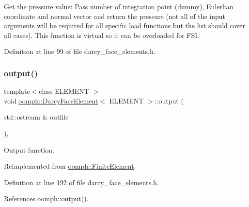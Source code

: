 Get the pressure value\+: Pass number of integration point (dummy), Eulerlian coordinate and normal vector and return the pressure (not all of the input arguments will be required for all specific load functions but the list should cover all cases). This function is virtual so it can be overloaded for F\+SI. 



Definition at line 99 of file darcy\+\_\+face\+\_\+elements.\+h.

\mbox{\label{classoomph_1_1DarcyFaceElement_aff94487a830df70d037c56d15fd4c462}} 
\subsubsection{\texorpdfstring{output()}{output()}\hspace{0.1cm}{\footnotesize\ttfamily [1/4]}}
{\footnotesize\ttfamily template$<$class E\+L\+E\+M\+E\+NT $>$ \\
void \hyperlink{classoomph_1_1DarcyFaceElement}{oomph\+::\+Darcy\+Face\+Element}$<$ E\+L\+E\+M\+E\+NT $>$\+::output (\begin{DoxyParamCaption}\item[{std\+::ostream \&}]{outfile }\end{DoxyParamCaption})\hspace{0.3cm}{\ttfamily [inline]}, {\ttfamily [virtual]}}



Output function. 



Reimplemented from \hyperlink{classoomph_1_1FiniteElement_a2ad98a3d2ef4999f1bef62c0ff13f2a7}{oomph\+::\+Finite\+Element}.



Definition at line 192 of file darcy\+\_\+face\+\_\+elements.\+h.



References oomph\+::output().

\mbox{\label{classoomph_1_1DarcyFaceElement_a74a836ffad2d7a2f219228fb01009026}} 
